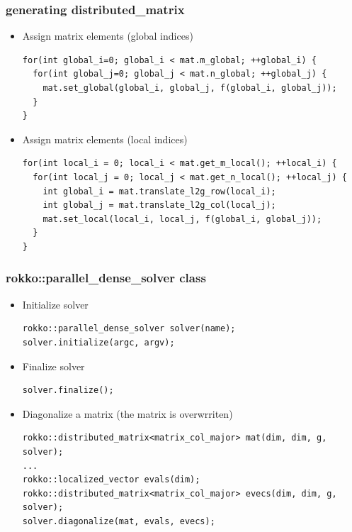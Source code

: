 \begin{frame}[c,fragile]
  \frametitle{generating distributed_matrix}
  \begin{itemize}
  \item Assign matrix elements (global indices)
\begin{lstlisting}
for(int global_i=0; global_i < mat.m_global; ++global_i) {
  for(int global_j=0; global_j < mat.n_global; ++global_j) {
    mat.set_global(global_i, global_j, f(global_i, global_j));
  }
}
\end{lstlisting}
  \item Assign matrix elements (local indices)
\begin{lstlisting}
for(int local_i = 0; local_i < mat.get_m_local(); ++local_i) {
  for(int local_j = 0; local_j < mat.get_n_local(); ++local_j) {
    int global_i = mat.translate_l2g_row(local_i);
    int global_j = mat.translate_l2g_col(local_j);
    mat.set_local(local_i, local_j, f(global_i, global_j));
  }
}
\end{lstlisting}
  \end{itemize}
\end{frame}

\begin{frame}[c,fragile]
  \frametitle{rokko::parallel_dense_solver class}
  \begin{itemize}
  \item Initialize solver
\begin{lstlisting}
rokko::parallel_dense_solver solver(name);
solver.initialize(argc, argv);
\end{lstlisting}
  \item Finalize solver
\begin{lstlisting}
solver.finalize();
\end{lstlisting}
  \item Diagonalize a matrix (the matrix is overwrriten)
\begin{lstlisting}
rokko::distributed_matrix<matrix_col_major> mat(dim, dim, g, solver);
...
rokko::localized_vector evals(dim);
rokko::distributed_matrix<matrix_col_major> evecs(dim, dim, g, solver);
solver.diagonalize(mat, evals, evecs);
\end{lstlisting}
  \end{itemize}
\end{frame}


